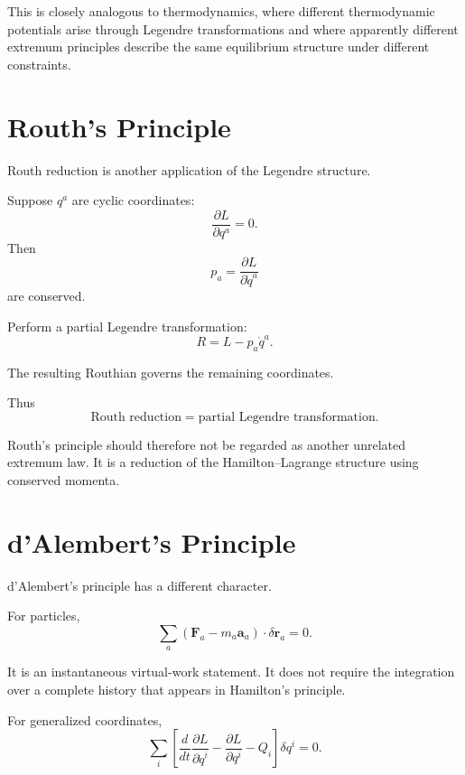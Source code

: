 This is closely analogous to thermodynamics, where different thermodynamic potentials arise through Legendre transformations and where apparently different extremum principles describe the same equilibrium structure under different constraints.

\section{Routh's Principle}

Routh reduction is another application of the Legendre structure.

Suppose $q^a$ are cyclic coordinates:
\begin{equation}
\frac{\partial L}{\partial q^a}=0.
\end{equation}
Then
\begin{equation}
p_a
=
\frac{\partial L}{\partial\dot q^a}
\end{equation}
are conserved.

Perform a partial Legendre transformation:
\begin{equation}
\boxed{
R
=
L-p_a\dot q^a.
}
\end{equation}

The resulting Routhian governs the remaining coordinates.

Thus
\begin{equation}
\boxed{
\text{Routh reduction}
=
\text{partial Legendre transformation}.
}
\end{equation}

Routh's principle should therefore not be regarded as another unrelated extremum law.  It is a reduction of the Hamilton--Lagrange structure using conserved momenta.

\section{d'Alembert's Principle}

d'Alembert's principle has a different character.

For particles,
\begin{equation}
\boxed{
\sum_a
(\mathbf F_a-m_a\mathbf a_a)
\cdot\delta\mathbf r_a=0.
}
\label{eq:dalembert}
\end{equation}

It is an instantaneous virtual-work statement.  It does not require the integration over a complete history that appears in Hamilton's principle.

For generalized coordinates,
\begin{equation}
\sum_i
\left[
\frac{d}{dt}
\frac{\partial L}{\partial\dot q^i}
-
\frac{\partial L}{\partial q^i}
-
Q_i
\right]\delta q^i=0.
\end{equation}

